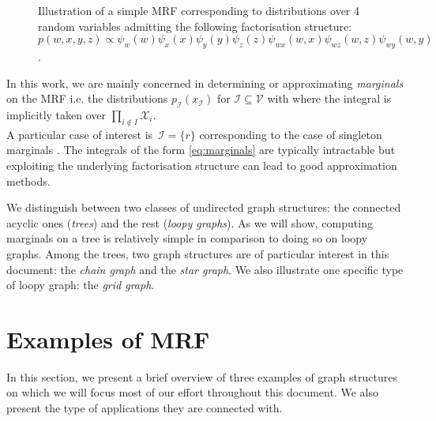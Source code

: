 \begin{figure}[!h]
\center
{}
\caption{\label{fig:simple-MRF}Illustration of a simple MRF corresponding to distributions over 4 random variables admitting the following factorisation structure:\\ $p(w,x,y,z)\propto \psi_{w}(w)\psi_{x}(x)\psi_{y}(y)\psi_{z}(z)\psi_{wx}(w,x)\psi_{wz}(w,z)\psi_{wy}(w,y)$.}
\end{figure}
In this work, we are mainly concerned in determining or approximating  \emph{marginals} on the MRF i.e. the distributions $p_{\mathcal I}(x_{\mathcal I})$ for $\mathcal I\subseteq\mathcal V$  with
where the integral is implicitly taken over $\prod_{i\notin I}\mathcal X_{i}$.\\
A particular case of interest is\, $\mathcal I=\{r\}$ corresponding to the case of singleton marginals \citep[section 2.3]{wainwright08}. The integrals of the form \eqref{eq:marginals} are typically intractable but exploiting the underlying factorisation structure can lead to good approximation methods.

We distinguish between two classes of undirected graph structures: the connected acyclic ones (\emph{trees}) and the rest (\emph{loopy graphs}). As we will show, computing marginals on a tree is relatively simple in comparison to doing so on loopy graphs. 
Among the trees, two graph structures are of particular interest in this document: the \emph{chain graph} and the \emph{star graph}. 
We also illustrate one specific type of loopy graph: the \emph{grid graph}.


\section{\label{intro:exMRF}Examples of MRF}
In this section, we present a brief overview of three examples of graph structures on which we will focus most of our effort throughout this document. 
We also present the type of applications they are connected with. 

